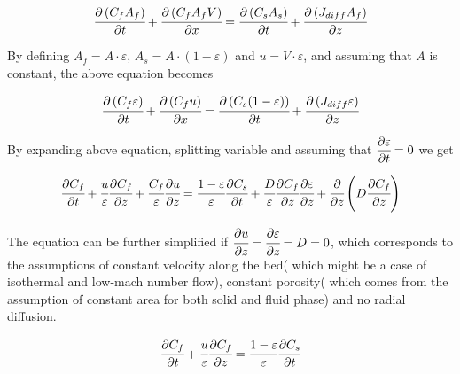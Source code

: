 \documentclass[../Article_Model_Parameters.tex]{subfiles}
\begin{document}
	{\footnotesize
		\begin{equation}
			\cfrac{\partial \left( C_f A_f \right)}{\partial t} + \cfrac{\partial \left( C_f A_f V \right)}{\partial x} = \cfrac{\partial \left( C_s A_s \right) }{\partial t} + \cfrac{\partial \left( J_{diff} A_f \right) }{\partial z}
		\end{equation}
	}

	By defining $A_f = A \cdot \varepsilon$, $A_s = A \cdot \left( 1-\varepsilon \right)$ and $u=V \cdot \varepsilon$, and assuming that $A$ is constant, the above equation becomes
	
	{\footnotesize
		\begin{equation}
			\cfrac{\partial \left( C_f \varepsilon \right)}{\partial t} + \cfrac{\partial \left( C_f u\right)}{\partial x} = \cfrac{\partial \left( C_s (1-\varepsilon) \right) }{\partial t} + \cfrac{\partial \left( J_{diff} \varepsilon \right) }{\partial z}
		\end{equation}
	}

	By expanding above equation, splitting variable and assuming that ${\footnotesize \cfrac{\partial \varepsilon}{\partial t}=0}$ we get
	
	{\footnotesize
		\begin{equation}
			\cfrac{\partial C_f}{\partial t} + \cfrac{u}{\varepsilon} \cfrac{\partial C_f}{\partial z} + \cfrac{C_f}{\varepsilon} \cfrac{\partial u}{\partial z} = \cfrac{1-\varepsilon}{\varepsilon} \cfrac{\partial C_s}{\partial t} + \cfrac{D}{\varepsilon} \cfrac{\partial C_f}{\partial z} \cfrac{\partial \varepsilon}{\partial z} + \cfrac{\partial}{\partial z} \left( D \cfrac{\partial C_f}{\partial z} \right)
		\end{equation}
	}
	
	The equation can be further simplified if $\cfrac{\partial u}{\partial z} = \cfrac{\partial \varepsilon}{\partial z} = D = 0$, which corresponds to the assumptions of constant velocity along the bed( which might be a case of isothermal and low-mach number flow), constant porosity( which comes from the assumption of constant area for both solid and fluid phase) and no radial diffusion.
	
	{\footnotesize
		\begin{equation}
			\cfrac{\partial C_f}{\partial t} + \cfrac{u}{\varepsilon} \cfrac{\partial C_f}{\partial z}  = \cfrac{1-\varepsilon}{\varepsilon} \cfrac{\partial C_s}{\partial t} 
			\label{EQ: Simplified_Species_Conservation}
		\end{equation}
	}
\end{document}
